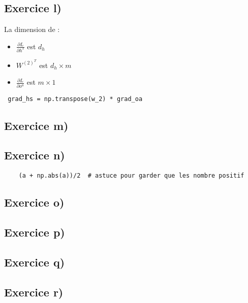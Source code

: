 \documentclass[a4paper,10pt]{article}
\begin{document}
\subsection{Exercice l)}

La dimension de :
\begin{itemize}
	\item $\frac{\partial L}{\partial h^{s}}$ est $d_{h}$
	\item $W^{(2)^T} $ est $d_{h} \times m$
	\item $\frac{\partial L}{\partial o^{a}}$ est $ m \times 1$
\end{itemize}

\begin{verbatim}
 grad_hs = np.transpose(w_2) * grad_oa	
\end{verbatim}

\subsection{Exercice m)}

\subsection{Exercice n)}

\begin{verbatim}
	(a + np.abs(a))/2  # astuce pour garder que les nombre positif
\end{verbatim}


\subsection{Exercice o)}

\subsection{Exercice p)}

\subsection{Exercice q)}

\subsection{Exercice r)}
\end{document}
